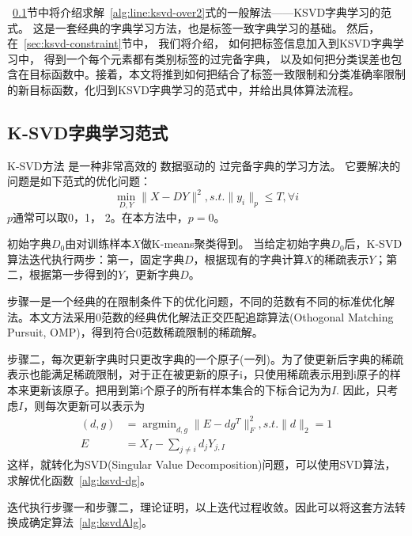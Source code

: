     ~\ref{sec:lsvd-lasso}节中将介绍求解~\ref{alg:line:ksvd-over2}式的一般解法——KSVD字典学习的范式。 这是一套经典的字典学习方法，也是标签一致字典学习的基础。 然后， 在~\ref{sec:ksvd-constraint}节中，  我们将介绍， 如何把标签信息加入到KSVD字典学习中，  得到一个每个元素都有类别标签的过完备字典\cite{jiang2013label}， 以及如何把分类误差也包含在目标函数中。接着，本文将推到如何把结合了标签一致限制和分类准确率限制的新目标函数，化归到KSVD字典学习的范式中，并给出具体算法流程。


    \subsection{K-SVD字典学习范式} 
    \label{sec:lsvd-lasso}
    K-SVD方法 \cite{aharon2006rm}是一种非常高效的 数据驱动的 过完备字典的学习方法。  它要解决的问题是如下范式的优化问题：
    \begin{equation}
    \label{alg:ksvd-lasso}
        \min _{D, Y} \| X - DY \| ^2 , s.t. \| y_i \| _p \le T, \forall i
    \end{equation}
    $p$通常可以取0，1， 2。在本方法中，$p = 0$。

    初始字典$D_0$由对训练样本$X$做K-means\cite{}聚类得到。
    当给定初始字典$D_0$后，K-SVD算法迭代执行两步：第一，固定字典$D$，根据现有的字典计算$X$的稀疏表示$Y$；第二，根据第一步得到的$Y$，更新字典$D$。

    步骤一是一个经典的在限制条件下的优化问题，不同的范数有不同的标准优化解法。本文方法采用0范数的经典优化解法正交匹配追踪算法(Othogonal Matching Pursuit, OMP)\cite{pati1993orthogonal}，得到符合0范数稀疏限制的稀疏解。

    步骤二，每次更新字典时只更改字典的一个原子(一列)。为了使更新后字典的稀疏表示也能满足稀疏限制，对于正在被更新的原子i，只使用稀疏表示用到i原子的样本来更新该原子。把用到第i个原子的所有样本集合的下标合记为为$I$. 因此，只考虑$I$，则每次更新可以表示为
    \begin{equation}
    \label{alg:ksvd-dg}
    \begin{split}
    (d, g) &= \mathop{\arg \min}_{d, g}\|E - d g^T\| ^2 _F, s.t.\|d\|_ 2 = 1 \\
    E &= X_I - \sum _{j\ne i} d_j Y_{j, I}
    \end{split}
    \end{equation}
    这样，就转化为SVD(Singular Value Decomposition)问题，可以使用SVD算法，求解优化函数~\ref{alg:ksvd-dg}。

    迭代执行步骤一和步骤二，理论证明\cite{aharon2006rm}，以上迭代过程收敛。因此可以将这套方法转换成确定算法~\ref{alg:ksvdAlg}。

